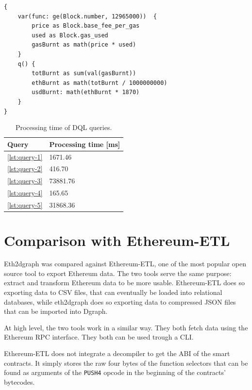 \begin{lstlisting}[caption={Query to compute the ETH burnt after London upgrade.},label={lst:query-5},captionpos=b,numbers=none]
{
    var(func: ge(Block.number, 12965000))  {
        price as Block.base_fee_per_gas
        used as Block.gas_used
        gasBurnt as math(price * used)
    }
    q() {
        totBurnt as sum(val(gasBurnt))
        ethBurnt as math(totBurnt / 1000000000)
        usdBurnt: math(ethBurnt * 1870) 
    }
}
\end{lstlisting}

\begin{table}[H]
\centering
    \begin{threeparttable}
    \begin{tabular}{ m{3cm} m{5cm} } 
    \toprule
    \textbf{Query} & \textbf{Processing time [ms]}\\
    \midrule
    \cref{lst:query-1}   & 1671.46  \\ [1.2ex]
    \cref{lst:query-2}   & 416.70  \\ [1.2ex]
    \cref{lst:query-3}   & 73881.76  \\ [1.2ex]
    \cref{lst:query-4}   & 165.65  \\ [1.2ex]
    \cref{lst:query-5}   & 31868.36  \\ [1.2ex]
    \bottomrule
    \end{tabular}
    \end{threeparttable}
    \caption{Processing time of DQL queries. }
    \label{table:queries-results}
\end{table}
 
\section{Comparison with Ethereum-ETL}

Eth2dgraph was compared against Ethereum-ETL, one of the most popular open source tool to export Ethereum data. The two tools serve the same purpose: extract and transform Ethereum data to be more usable.
Ethereum-ETL does so exporting data to CSV files, that can eventually be loaded into relational databases, while eth2dgraph does so exporting data to compressed JSON files that can be imported into Dgraph. 

At high level, the two tools work in a similar way. They both fetch data using the Ethereum RPC interface. They both can be used trough a CLI.

Ethereum-ETL does not integrate a decompiler to get the ABI of the smart contracts. It simply stores the raw four bytes of the function selectors that can be found as arguments of the {\tt PUSH4} opcode in the beginning of the contracts' bytecodes. 

